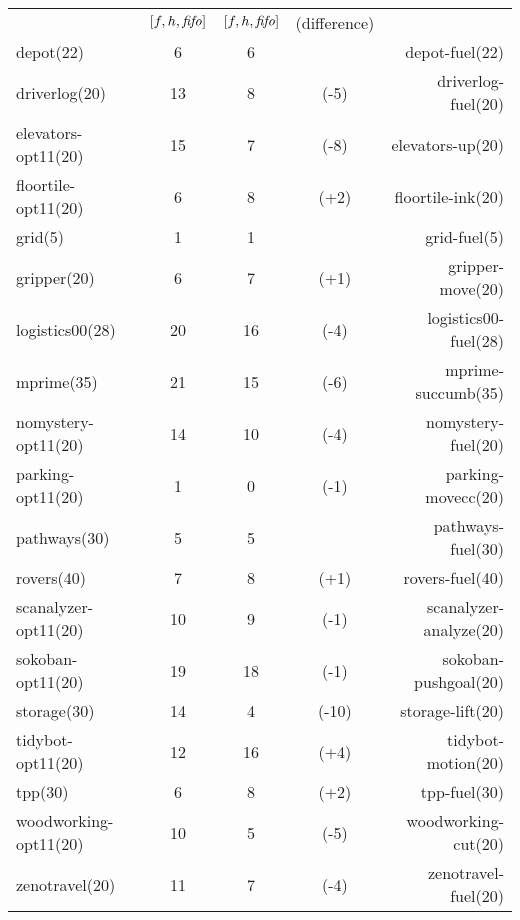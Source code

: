 \begin{center}
\begin{tabular}{|lc|ccr|}
 & \([f,h,{\text{\textit{fifo}}}]\) & \([f,h,{\text{\textit{fifo}}}]\) & (difference) & \\
depot(22) & 6 & 6 &  & depot-fuel(22)\\
driverlog(20) & 13 & 8 & (-5) & driverlog-fuel(20)\\
elevators-opt11(20) & 15 & 7 & (-8) & elevators-up(20)\\
floortile-opt11(20) & 6 & 8 & (+2) & floortile-ink(20)\\
grid(5) & 1 & 1 &  & grid-fuel(5)\\
gripper(20) & 6 & 7 & (+1) & gripper-move(20)\\
logistics00(28) & 20 & 16 & (-4) & logistics00-fuel(28)\\
mprime(35) & 21 & 15 & (-6) & mprime-succumb(35)\\
nomystery-opt11(20) & 14 & 10 & (-4) & nomystery-fuel(20)\\
parking-opt11(20) & 1 & 0 & (-1) & parking-movecc(20)\\
pathways(30) & 5 & 5 &  & pathways-fuel(30)\\
rovers(40) & 7 & 8 & (+1) & rovers-fuel(40)\\
scanalyzer-opt11(20) & 10 & 9 & (-1) & scanalyzer-analyze(20)\\
sokoban-opt11(20) & 19 & 18 & (-1) & sokoban-pushgoal(20)\\
storage(30) & 14 & 4 & (-10) & storage-lift(20)\\
tidybot-opt11(20) & 12 & 16 & (+4) & tidybot-motion(20)\\
tpp(30) & 6 & 8 & (+2) & tpp-fuel(30)\\
woodworking-opt11(20) & 10 & 5 & (-5) & woodworking-cut(20)\\
zenotravel(20) & 11 & 7 & (-4) & zenotravel-fuel(20)\\
\end{tabular}
\end{center}
